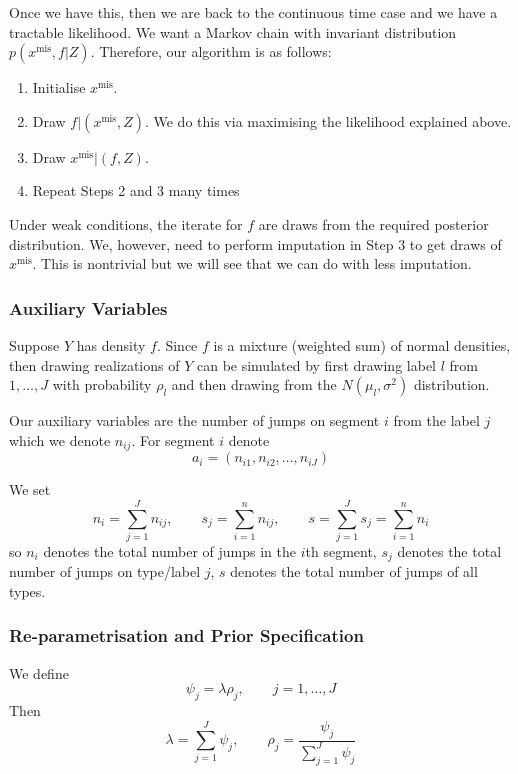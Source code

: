 \documentclass[a4paper,11pt]{article}
\theoremstyle{theorem}
\theoremstyle{definition}
\theoremstyle{remark}
\begin{document}
Once we have this, then we are back to the continuous time case and we have a tractable likelihood. We want a Markov chain with invariant distribution $p(x^{\text{mis}}, f | Z)$. Therefore, our algorithm is as follows:
\begin{enumerate}
\item Initialise $x^{\text{mis}}$.
\item Draw $f | (x^{\text{mis}}, Z)$. We do this via maximising the likelihood explained above.
\item Draw $x^{\text{mis}} | (f, Z)$.
\item Repeat Steps 2 and 3 many times
\end{enumerate}

Under weak conditions, the iterate for $f$ are draws from the required posterior distribution. We, however, need to perform imputation in Step 3 to get draws of $x^{\text{mis}}$. This is nontrivial but we will see that we can do with less imputation.

\subsubsection{Auxiliary Variables}

Suppose $Y$ has density $f$. Since $f$ is a mixture (weighted sum) of normal densities, then drawing realizations of $Y$ can be simulated by first drawing label $l$ from $1, \dotsc, J$ with probability $\rho_l$ and then drawing from the $N(\mu_l, \sigma^2)$ distribution.

Our auxiliary variables are the number of jumps on segment $i$ from the label $j$ which we denote $n_{ij}$. For segment $i$ denote
\[
a_i = (n_{i1}, n_{i2}, \dotsc, n_{iJ})
\]

We set
\[
n_i = \sum_{j=1}^{J}{n_{ij}}, \qquad s_j = \sum_{i=1}^{n}{n_{ij}}, \qquad s = \sum_{j=1}^{J}{s_j} = \sum_{i=1}^{n}{n_i}
\]
so $n_i$ denotes the total number of jumps in the $i$th segment, $s_j$ denotes the total number of jumps on type/label $j$, $s$ denotes the total number of jumps of all types.
 
\subsubsection{Re-parametrisation and Prior Specification}

We define
\[
\psi_j = \lambda \rho_j, \qquad j = 1, \dotsc, J
\]
Then
\[
\lambda = \sum_{j=1}^{J}{\psi_j}, \qquad \rho_j = \frac{\psi_j}{\sum_{j=1}^{J}{\psi_j}}
\]
\end{document}
